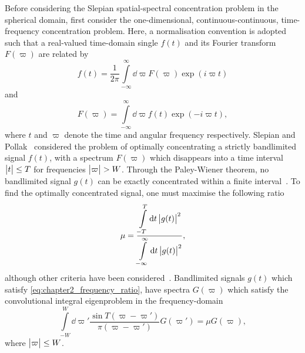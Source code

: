 Before considering the Slepian spatial-spectral concentration problem in the spherical domain, first consider the one-dimensional, continuous-continuous, time-frequency concentration problem.
Here, a normalisation convention is adopted such that a real-valued time-domain single \(f(t)\) and its Fourier transform \(F(\varpi)\) are related by
%
\begin{equation}
	f(t)
	= \frac{1}{2\pi} \int\limits_{-\infty}^{\infty} \dd{\varpi} F(\varpi) \exp(i\varpi t)
\end{equation}
%
and
%
\begin{equation}
	F(\varpi)
	= \int\limits_{-\infty}^{\infty} \dd{\varpi} f(t) \exp(-i\varpi t),
\end{equation}
%
where \(t\) and \(\varpi{}\) denote the time and angular frequency respectively.
Slepian and Pollak~\cite{Slepian1961} considered the problem of optimally concentrating a strictly bandlimited signal \(f(t)\), with a spectrum \(F(\varpi)\) which disappears into a time interval \(\big\lvert t\big\rvert \leq T\) for frequencies \(\big\lvert\varpi\big\rvert > W\).
Through the Paley-Wiener theorem, no bandlimited signal \(g(t)\) can be exactly concentrated within a finite interval~\cite{Daubechies1992,Mallat2008}.
To find the optimally concentrated signal, one must maximise the following ratio
%
\begin{equation}\label{eq:chapter2_frequency_ratio}
	\mu
	= \frac{\displaystyle\int\limits_{-T}^{T} \dd{t} \big\lvert g(t)\big\rvert^{2}}
	{\displaystyle\int\limits_{-\infty}^{\infty} \dd{t} \big\lvert g(t)\big\rvert^{2}},
\end{equation}
%
although other criteria have been considered~\cite{Freeden1997,Riedel1995}.
Bandlimited signals \(g(t)\) which satisfy \cref{eq:chapter2_frequency_ratio}, have spectra \(G(\varpi)\) which satisfy the convolutional integral eigenproblem in the frequency-domain
%
\begin{equation}\label{eq:chapter2_frequency_eigenproblem}
	\int\limits_{-W}^{W} \dd{\varpi'} \frac{\sin{T(\varpi-\varpi')}}{\pi(\varpi-\varpi')} G(\varpi')
	= \mu G(\varpi),
\end{equation}
%
where \(\big\lvert\varpi\big\rvert \leq W\).

